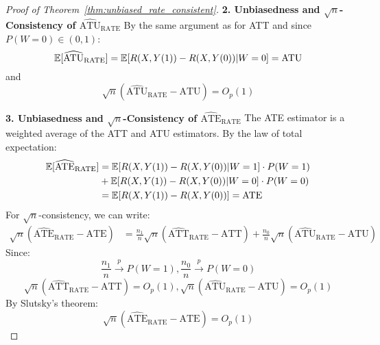 \begin{proof}[Proof of Theorem~\ref{thm:unbiased_rate_consistent}]
    \textbf{2. Unbiasedness and $\sqrt{n}$-Consistency of $\widehat{\text{ATU}}_{\text{RATE}}$}
    By the same argument as for ATT and since $P(W=0) \in (0,1)$:
    \[\mathbb{E}[\widehat{\text{ATU}}_{\text{RATE}}] = \mathbb{E}[R(X, Y(1)) - R(X, Y(0)) | W = 0] = \text{ATU}\]
    and
    \[\sqrt{n}(\widehat{\text{ATU}}_{\text{RATE}} - \text{ATU}) = O_p(1)\]

    \textbf{3. Unbiasedness and $\sqrt{n}$-Consistency of $\widehat{\text{ATE}}_{\text{RATE}}$}
    The ATE estimator is a weighted average of the ATT and ATU estimators. By the law of total expectation:
    \begin{align*}
    \mathbb{E}[\widehat{\text{ATE}}_{\text{RATE}}] &= \mathbb{E}[R(X, Y(1)) - R(X, Y(0)) | W = 1] \cdot P(W = 1) \\
    &+ \mathbb{E}[R(X, Y(1)) - R(X, Y(0)) | W = 0] \cdot P(W = 0) \\
    &= \mathbb{E}[R(X, Y(1)) - R(X, Y(0))] = \text{ATE}
    \end{align*}
    For $\sqrt{n}$-consistency, we can write:
    \begin{align*}
    \sqrt{n}(\widehat{\text{ATE}}_{\text{RATE}} - \text{ATE}) &= \frac{n_1}{n}\sqrt{n}(\widehat{\text{ATT}}_{\text{RATE}} - \text{ATT}) + \frac{n_0}{n}\sqrt{n}(\widehat{\text{ATU}}_{\text{RATE}} - \text{ATU})
    \end{align*}
    Since:
    \[\frac{n_1}{n} \xrightarrow{p} P(W=1), \frac{n_0}{n} \xrightarrow{p} P(W=0)\]
    \[\sqrt{n}(\widehat{\text{ATT}}_{\text{RATE}} - \text{ATT}) = O_p(1), \sqrt{n}(\widehat{\text{ATU}}_{\text{RATE}} - \text{ATU}) = O_p(1)\]
    By Slutsky's theorem:
    \[\sqrt{n}(\widehat{\text{ATE}}_{\text{RATE}} - \text{ATE}) = O_p(1)\]
\end{proof}

\newpage





